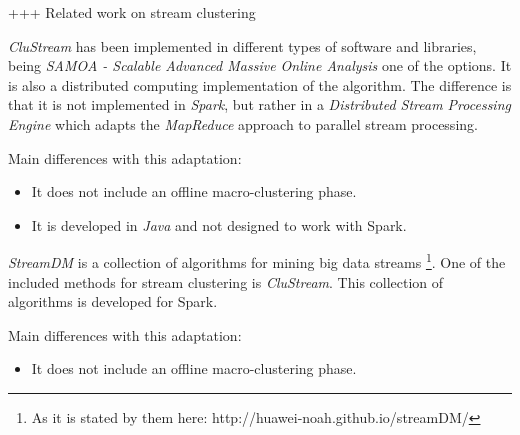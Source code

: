 \color{red}
+++ Related work on stream clustering
\color{black}


\textit{CluStream} has been implemented in different types of software and libraries, being \textit{SAMOA - Scalable Advanced Massive Online Analysis} one of the options. It is also a distributed computing implementation of the algorithm. The difference is that it is not implemented in \textit{Spark}, but rather in a \textit{Distributed Stream Processing Engine} which adapts the \textit{MapReduce} approach to parallel stream processing\cite{samoa}.

Main differences with this adaptation: 

\begin{itemize}
 \item It does not include an offline macro-clustering phase.
 \item It is developed in \textit{Java} and not designed to work with Spark.
\end{itemize}

\textit{StreamDM} is a collection of algorithms for mining big data streams \footnote{As it is stated by them here: http://huawei-noah.github.io/streamDM/}. One of the included methods for stream clustering is \textit{CluStream}. This collection of algorithms is developed for Spark.

Main differences with this adaptation: 

\begin{itemize}
 \item It does not include an offline macro-clustering phase.
\end{itemize}